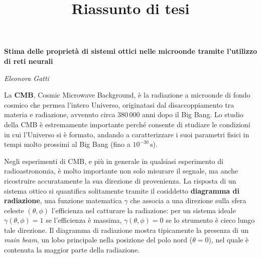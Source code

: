 \documentclass[12pt,a4paper,final]{report}			%
\title{Riassunto di tesi}
\begin{document}
\begin{center}
	\LARGE \textbf{Stima delle proprietà di sistemi ottici nelle microonde tramite l'utilizzo di reti neurali}
\end{center}
\begin{center}
	\normalsize \textit{Eleonora Gatti}
\end{center}

\vspace{5mm}


La \textbf{CMB}, Cosmic Microwave Background, \`e la radiazione a microonde di fondo cosmico che permea l’intero Universo, originatasi dal disaccoppiamento tra materia e radiazione, avvenuto circa 380\,000 anni dopo il Big Bang. Lo studio della CMB è estremamente importante perché consente di studiare le condizioni in cui l'Universo si è formato, andando a caratterizzare i suoi parametri fisici in tempi molto prossimi al Big Bang (fino a $10^{-30}\,\text{s}$).

Negli esperimenti di CMB, e più in generale in qualsiasi esperimento di radioastronomia, è molto importante non solo misurare il segnale, ma anche ricostruire accuratamente la sua direzione di provenienza. La risposta di un sistema ottico si quantifica solitamente tramite il cosiddetto \textbf{diagramma di radiazione}, una funzione matematica $\gamma$ che associa a una direzione sulla sfera celeste $(\theta, \phi)$ l'efficienza nel catturare la radiazione: per un sistema ideale $\gamma(\theta, \phi) = 1$ se l'efficienza è massima, $\gamma(\theta, \phi) = 0$ se lo strumento è cieco lungo tale direzione. Il diagramma di radiazione mostra tipicamente la presenza di un \textit{main beam}, un lobo principale nella posizione del polo nord ($\theta = 0$), nel quale è contenuta la maggior parte della radiazione.
\end{document}
